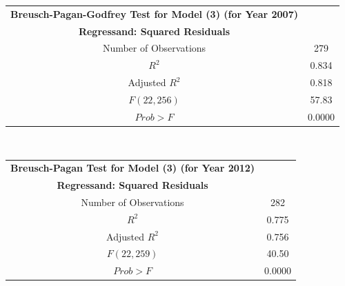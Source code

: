 \begin{table}[h]
\centering
\begin{tabular}{ c | c }
	\hline
	\textbf{Breusch-Pagan-Godfrey Test for Model (3) (for Year 2007)} \\
    \textbf{Regressand: Squared Residuals} \\
    \hline \hline
    Number of Observations & 279 \\
	\hline
    $R^{2}$ & 0.834 \\
    Adjusted $R^{2}$ & 0.818 \\
    \hline
    $F(22, 256)$ & 57.83 \\
    $Prob > F$ & 0.0000 \\
    \hline \hline
\end{tabular} \\
\end{table}

\begin{table}[h]
\centering
\begin{tabular}{ c | c }
	\hline
	\textbf{Breusch-Pagan Test for Model (3) (for Year 2012)} \\
    \textbf{Regressand: Squared Residuals} \\
    \hline \hline
    Number of Observations & 282 \\
	\hline
    $R^{2}$ & 0.775 \\
    Adjusted $R^{2}$ & 0.756 \\
    \hline
    $F(22, 259)$ & 40.50 \\
    $Prob > F$ & 0.0000 \\
    \hline \hline
\end{tabular} \\
\end{table}

